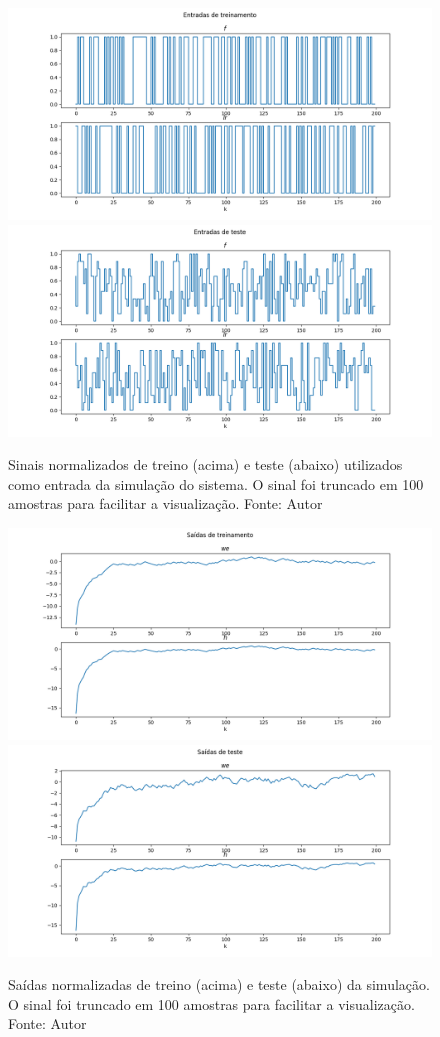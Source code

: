\begin{figure}[hbt!]
    \centering
    \includegraphics[width=0.8\linewidth]{Imagens/chap04/simulation_inputs_train.png}
    \hfill
    \includegraphics[width=0.8\linewidth]{Imagens/chap04/simulation_inputs_test.png}
    \caption{Sinais normalizados de treino (acima) e teste (abaixo) utilizados como entrada da simulação do sistema.
 O sinal foi truncado em 100 amostras para facilitar a visualização. Fonte: Autor}
    \label{fig:sim_inputs}
\end{figure}

\begin{figure}[hbt!]
    \centering
    \includegraphics[width=0.8\linewidth]{Imagens/chap04/simulation_outputs_train.png}
    \hfill
    \includegraphics[width=0.8\linewidth]{Imagens/chap04/simulation_outputs_test.png}
    \caption{Saídas normalizadas de treino (acima) e teste (abaixo) da simulação. O sinal foi truncado em 100 amostras para facilitar a visualização. Fonte: Autor}
    \label{fig:sim_outputs}
\end{figure}

